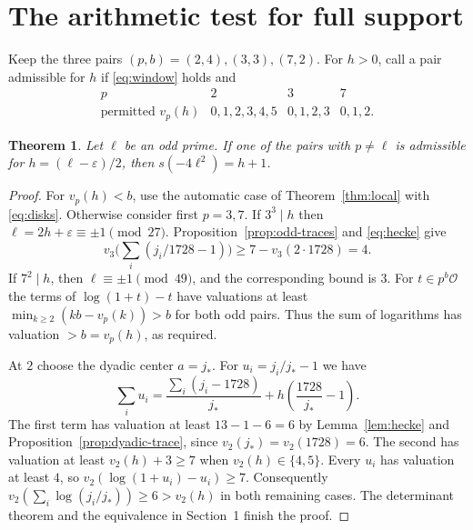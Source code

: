 \documentclass[11pt]{article}
\newtheorem{theorem}{Theorem}[section]
\newcommand{\OO}{\mathcal O}
\begin{document}
\section{The arithmetic test for full support}
Keep the three pairs $(p,b)=(2,4),(3,3),(7,2)$. For $h>0$, call a pair admissible for $h$ if \eqref{eq:window} holds and
\begin{equation}\label{eq:allowed}
\begin{array}{c|ccc}
p&2&3&7\\ \hline
\text{permitted }v_p(h)&0,1,2,3,4,5&0,1,2,3&0,1,2 .
\end{array}
\end{equation}
\begin{theorem}\label{thm:criterion}
Let $\ell$ be an odd prime. If one of the pairs with $p\ne\ell$ is admissible for $h=(\ell-\varepsilon)/2$, then $s(-4\ell^2)=h+1$.
\end{theorem}
\begin{proof}
For $v_p(h)<b$, use the automatic case of Theorem~\ref{thm:local} with \eqref{eq:disks}. Otherwise consider first $p=3,7$. If $3^3\mid h$ then $\ell=2h+\varepsilon\equiv\pm1\pmod{27}$. Proposition~\ref{prop:odd-traces} and \eqref{eq:hecke} give
\[
 v_3\Big(\sum_i(j_i/1728-1)\Big)\ge7-v_3(2\cdot1728)=4.
\]
If $7^2\mid h$, then $\ell\equiv\pm1\pmod{49}$, and the corresponding bound is $3$. For $t\in p^b\OO$ the terms of $\log(1+t)-t$ have valuations at least $\min_{k\ge2}(kb-v_p(k))>b$ for both odd pairs. Thus the sum of logarithms has valuation $>b=v_p(h)$, as required.

At $2$ choose the dyadic center $a=j_*$. For $u_i=j_i/j_*-1$ we have
\[
 \sum_i u_i =
 \frac{\sum_i(j_i-1728)}{j_*}
       +h\left(\frac{1728}{j_*}-1\right).
\]
The first term has valuation at least $13-1-6=6$ by Lemma~\ref{lem:hecke} and Proposition~\ref{prop:dyadic-trace}, since $v_2(j_*)=v_2(1728)=6$. The second has valuation at least $v_2(h)+3\ge7$ when $v_2(h)\in\{4,5\}$. Every $u_i$ has valuation at least $4$, so $v_2(\log(1+u_i)-u_i)\ge7$. Consequently $v_2(\sum_i\log(j_i/j_*))\ge6>v_2(h)$ in both remaining cases. The determinant theorem and the equivalence in Section~1 finish the proof.
\end{proof}
\end{document}
